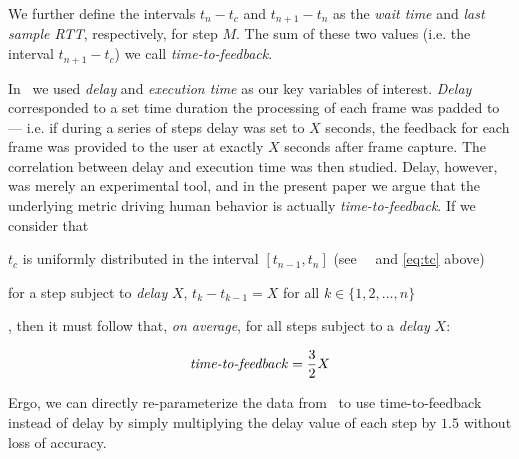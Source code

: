 We further define the intervals \( t_n - t_c \) and \( t_{n + 1} - t_n \) as the \emph{wait time} and \emph{last sample \ac{RTT}}, respectively, for step \( M \).
The sum of these two values (i.e. the interval \( t_{n + 1} - t_c \)) we call \emph{time-to-feedback}.

In~\cite{olguinmunoz:impact2021} we used \emph{delay} and \emph{execution time} as our key variables of interest.
\emph{Delay} corresponded to a set time duration the processing of each frame was padded to --- i.e. if during a series of steps delay was set to \( X \) seconds, the feedback for each frame was provided to the user at exactly \( X \) seconds after frame capture.
The correlation between delay and execution time was then studied.
Delay, however, was merely an experimental tool, and in the present paper we argue that the underlying metric driving  human behavior is actually \emph{time-to-feedback}.
If we consider that
\begin{enumerate*}[itemjoin={{; }}, itemjoin={{; and }}]
    \item \( t_c \) is uniformly distributed in the interval \( [t_{n - 1}, t_{n}] \) (see~~\cite{olguinmunoz:impact2021} and \cref{eq:tc} above)
    \item for a step subject to \emph{delay} \( X \), \( t_k - t_{k - 1} = X \) for all \( k \in \{1, 2, \ldots, n\} \)
\end{enumerate*},
then it must follow that, \emph{on average}, for all steps subject to a \emph{delay} \( X \):

\begin{equation}\label{eq:ttf}
    \text{\emph{time-to-feedback}} = \frac{3}{2}X
\end{equation}

Ergo, we can directly re-parameterize the data from~\cite{olguinmunoz:impact2021} to use time-to-feedback instead of delay by simply multiplying the delay value of each step by \( 1.5 \) without loss of accuracy.

\newpage